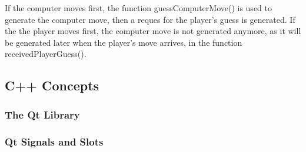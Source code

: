 If the computer moves first, the function guessComputerMove() is used to generate the computer move, then a reques for the player's guess is generated. If the the player moves first, the computer move is not generated anymore, as it will be generated later when the player's move arrives, in the function receivedPlayerGuess().

\subsection{C++ Concepts}

\subsubsection{The Qt Library}

\subsubsection{Qt Signals and Slots} \label {Qt_Signals_Slots}